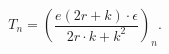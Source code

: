 \begin{equation}
T_{n}=\left(  \frac{e(2r+k)\cdot\epsilon}{2r\cdot k+k^{2}}\right)  _{n}.
\end{equation}

